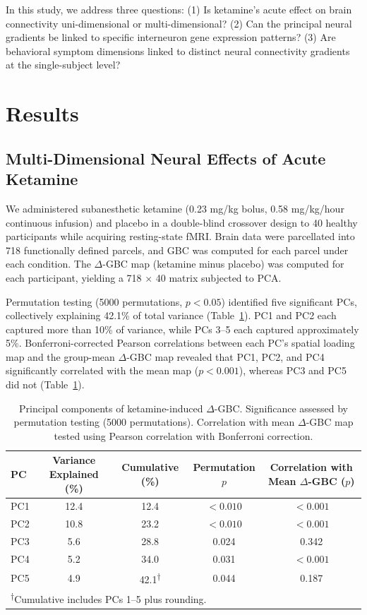 \documentclass[11pt]{article}
\begin{document}
In this study, we address three questions: (1) Is ketamine's acute effect on brain connectivity uni-dimensional or multi-dimensional? (2) Can the principal neural gradients be linked to specific interneuron gene expression patterns? (3) Are behavioral symptom dimensions linked to distinct neural connectivity gradients at the single-subject level?

\section{Results}

\subsection{Multi-Dimensional Neural Effects of Acute Ketamine}

We administered subanesthetic ketamine (0.23 mg/kg bolus, 0.58 mg/kg/hour continuous infusion) and placebo in a double-blind crossover design to 40 healthy participants while acquiring resting-state fMRI. Brain data were parcellated into 718 functionally defined parcels, and GBC was computed for each parcel under each condition. The $\Delta$-GBC map (ketamine minus placebo) was computed for each participant, yielding a 718 $\times$ 40 matrix subjected to PCA.

Permutation testing (5000 permutations, $p < 0.05$) identified five significant PCs, collectively explaining 42.1\% of total variance (Table~\ref{tab:pca_results}). PC1 and PC2 each captured more than 10\% of variance, while PCs 3--5 each captured approximately 5\%. Bonferroni-corrected Pearson correlations between each PC's spatial loading map and the group-mean $\Delta$-GBC map revealed that PC1, PC2, and PC4 significantly correlated with the mean map ($p < 0.001$), whereas PC3 and PC5 did not (Table~\ref{tab:pca_results}).

\begin{table}[H]
\centering
\caption{Principal components of ketamine-induced $\Delta$-GBC. Significance assessed by permutation testing (5000 permutations). Correlation with mean $\Delta$-GBC map tested using Pearson correlation with Bonferroni correction.}
\label{tab:pca_results}
\begin{tabular}{lcccc}
\toprule
\textbf{PC} & \textbf{Variance Explained (\%)} & \textbf{Cumulative (\%)} & \textbf{Permutation $p$} & \textbf{Correlation with Mean $\Delta$-GBC ($p$)} \\
\midrule
PC1 & 12.4 & 12.4 & $< 0.010$ & $< 0.001$ \\
PC2 & 10.8 & 23.2 & $< 0.010$ & $< 0.001$ \\
PC3 & 5.6 & 28.8 & 0.024 & 0.342 \\
PC4 & 5.2 & 34.0 & 0.031 & $< 0.001$ \\
PC5 & 4.9 & 42.1\textsuperscript{$\dagger$} & 0.044 & 0.187 \\
\bottomrule
\multicolumn{5}{l}{\small \textsuperscript{$\dagger$}Cumulative includes PCs 1--5 plus rounding.} \\
\end{tabular}
\end{table}
\end{document}
